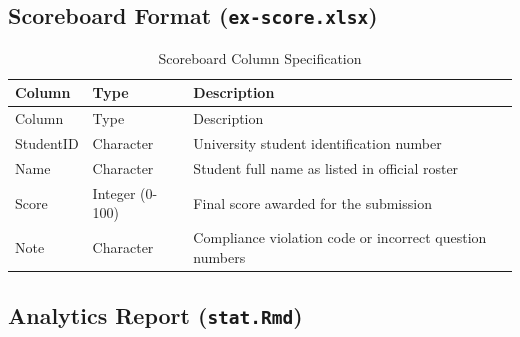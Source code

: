 \documentclass[
]{article}
\begin{document}
\subsection{\texorpdfstring{Scoreboard Format
(\texttt{ex-score.xlsx})}{Scoreboard Format (ex-score.xlsx)}}\label{scoreboard-format-ex-score.xlsx}

\begin{longtable}[]{@{}
  >{\raggedright\arraybackslash}p{}
  >{\raggedright\arraybackslash}p{}
  >{\raggedright\arraybackslash}p{}@{}}
\caption{Scoreboard Column Specification}\tabularnewline
\toprule\noalign{}
\begin{minipage}[b]{\linewidth}\raggedright
Column
\end{minipage} & \begin{minipage}[b]{\linewidth}\raggedright
Type
\end{minipage} & \begin{minipage}[b]{\linewidth}\raggedright
Description
\end{minipage} \\
\midrule\noalign{}
\endfirsthead
\toprule\noalign{}
\begin{minipage}[b]{\linewidth}\raggedright
Column
\end{minipage} & \begin{minipage}[b]{\linewidth}\raggedright
Type
\end{minipage} & \begin{minipage}[b]{\linewidth}\raggedright
Description
\end{minipage} \\
\midrule\noalign{}
\endhead
\bottomrule\noalign{}
\endlastfoot
StudentID & Character & University student identification number \\
Name & Character & Student full name as listed in official roster \\
Score & Integer (0-100) & Final score awarded for the submission \\
Note & Character & Compliance violation code or incorrect question
numbers \\
\end{longtable}

\subsection{\texorpdfstring{Analytics Report
(\texttt{stat.Rmd})}{Analytics Report (stat.Rmd)}}\label{analytics-report-stat.rmd}
\end{document}
